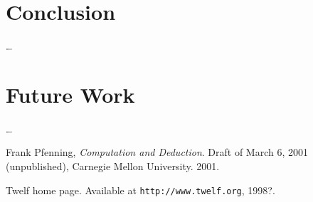 \section{Conclusion}


\ldots

\section{Future Work}


\ldots

\clearpage

\begin{thebibliography}{9}

Frank Pfenning, \textit{Computation and Deduction}. Draft of March 6, 2001 (unpublished), Carnegie Mellon University. 2001.

Twelf home page. Available at \texttt{http://www.twelf.org}, 1998?.

\end{thebibliography}

